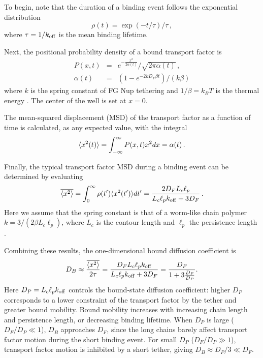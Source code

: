 To begin, note that the duration of a binding event follows the exponential distribution 
\begin{equation}
\rho (t) = \exp(-t/\tau)/\tau\,,
\end{equation}
where $\tau = 1/k_{\rm off}$ is the mean binding lifetime.

Next, the positional probability density of a bound transport factor is 
\begin{eqnarray}
P(x,t) &=& e^{-\frac{x^2}{2 \alpha(t)}}/\sqrt{2\pi \alpha(t)}\,,\\
\alpha(t) &=& (1-e^{-2kD_F\beta t})/(k\beta)
\end{eqnarray}
 where $k$ is the spring constant of FG Nup tethering and $1/\beta = k_BT$ is the thermal energy \cite{doi88}.  The center of the well is set at $x=0$.

The mean-squared displacement (MSD) of the transport factor as a function of time is calculated, as any expected value, with the integral
\begin{equation}
\langle x^2(t) \rangle = \int_{-\infty}^{\infty} P(x,t) x^2 dx = \alpha(t)\,.
\end{equation}

Finally, the typical transport factor MSD during a binding event can be determined by evaluating
\begin{equation}\label{eq:sho}
  \overline{\langle x^2 \rangle} = \int_0^{\infty} \rho(t') \langle x^2(t') \rangle dt' = \frac{2D_F L_c
    \ell_p}{L_c \ell_p k_{\rm off}+ 3D_F}\,. 
\end{equation} %
Here we assume that the spring constant is that of a worm-like chain polymer $k = 3/(2\beta L_c \ell_p)$, where $L_c$ is the contour length and $\ell_p$ the persistence length \cite{howard01}.

Combining these results, the one-dimensional bound diffusion coefficient is
\begin{equation}\label{eq:dbound}
  D_B \approx \frac{\overline{\langle x^2 \rangle}}{2\tau} = \frac{D_F L_c \ell_p
    k_{\mathrm{off}}}{L_c \ell_p k_{\mathrm{off}} + 3D_F} =
  \frac{D_F}{1+3\frac{D_F}{D_{P}}}.  
\end{equation}
Here $D_P = L_c \ell_p k_{\mathrm{off}}$ controls the bound-state diffusion coefficient: higher $D_P$ corresponds to a lower constraint of the transport factor by the tether and greater bound mobility. Bound mobility increases with increasing chain length and persistence length, or decreasing binding lifetime. When $D_P$ is large ($D_F/D_P\ll1$), $D_B$ approaches $D_F$, since the long chains barely affect transport factor motion during the short binding event. For small $D_P$ ($D_F/D_P\gg1$), transport factor motion is inhibited by a short tether, giving $D_B\approx D_P/3\ll D_F$.  


